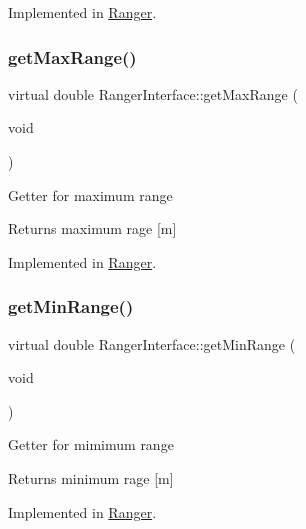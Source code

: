 Implemented in \hyperlink{classRanger_a4bca7dce56b7959257d90b1f30bf0271}{Ranger}.

\mbox{\label{classRangerInterface_a0bb29a41de5767c99081002c0590c186}} 
\subsubsection{\texorpdfstring{get\+Max\+Range()}{getMaxRange()}}
{\footnotesize\ttfamily virtual double Ranger\+Interface\+::get\+Max\+Range (\begin{DoxyParamCaption}\item[{void}]{ }\end{DoxyParamCaption})\hspace{0.3cm}{\ttfamily [pure virtual]}}

Getter for maximum range \begin{DoxyReturn}{Returns}
maximum rage \mbox{[}m\mbox{]} 
\end{DoxyReturn}


Implemented in \hyperlink{classRanger_aba5e81260e55089d9ff869051156a722}{Ranger}.

\mbox{\label{classRangerInterface_ae6d501ddeeaad4a7b44d7d51ce64cb88}} 
\subsubsection{\texorpdfstring{get\+Min\+Range()}{getMinRange()}}
{\footnotesize\ttfamily virtual double Ranger\+Interface\+::get\+Min\+Range (\begin{DoxyParamCaption}\item[{void}]{ }\end{DoxyParamCaption})\hspace{0.3cm}{\ttfamily [pure virtual]}}

Getter for mimimum range \begin{DoxyReturn}{Returns}
minimum rage \mbox{[}m\mbox{]} 
\end{DoxyReturn}


Implemented in \hyperlink{classRanger_a646a06d3916179b9ebc4502bad169eec}{Ranger}.


